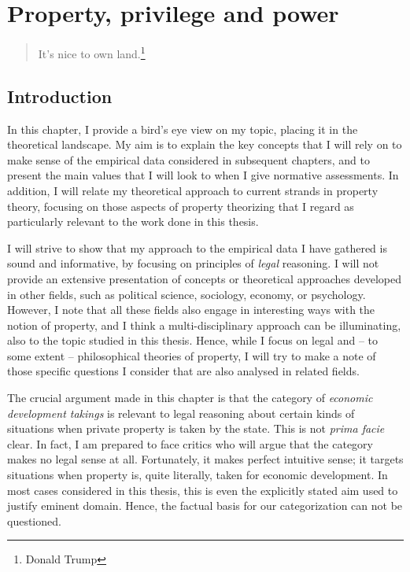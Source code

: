 \chapter{Property, privilege and power}\label{chap:1}

\begin{quote}
It's nice to own land.\footnote{Donald Trump}
\end{quote}

\section{Introduction}

In this chapter, I provide a bird's eye view on my topic, placing it in the theoretical landscape. My aim is to explain the key concepts that I will rely on to make sense of the empirical data considered in subsequent chapters, and to present the main values that I will look to when I give normative assessments. In addition, I will relate my theoretical approach to current strands in property theory, focusing on those aspects of property theorizing that I regard as particularly relevant to the work done in this thesis.

I will strive to show that my approach to the empirical data I have gathered is sound and informative, by focusing on principles of {\it legal} reasoning. I will not provide an extensive presentation of concepts or theoretical approaches developed in other fields, such as political science, sociology, economy, or psychology. However, I note that all these fields also engage in interesting ways with the notion of property, and I think a multi-disciplinary approach can be illuminating, also to the topic studied in this thesis. Hence, while I focus on legal and --  to some extent -- philosophical theories of property, I will try to make a note of those specific questions I consider that are also analysed in related fields.

The crucial argument made in this chapter is that the category of {\it economic development takings} is relevant to legal reasoning about certain kinds of situations when private property is taken by the state. This is not {\it prima facie} clear. In fact, I am prepared to face critics who will argue that the category makes no legal sense at all. Fortunately, it makes perfect intuitive sense; it targets situations when property is, quite literally, taken for economic development. In most cases considered in this thesis, this is even the explicitly stated aim used to justify eminent domain. Hence, the factual basis for our categorization can not be questioned. 

